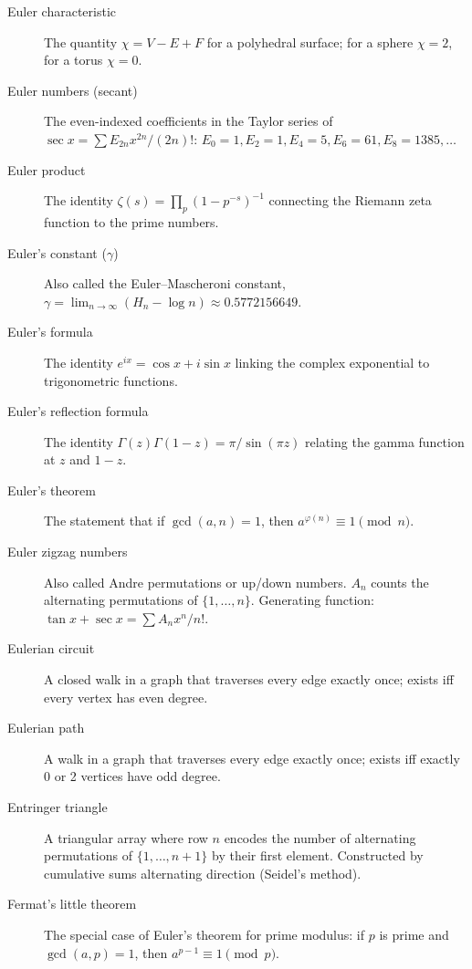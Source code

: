 \begin{description}
\item[Euler characteristic] The quantity $\chi = V - E + F$ for a polyhedral surface; for a sphere $\chi = 2$, for a torus $\chi = 0$.

\item[Euler numbers (secant)] The even-indexed coefficients in the Taylor series of $\sec x = \sum E_{2n} x^{2n}/(2n)!$: $E_0=1, E_2=1, E_4=5, E_6=61, E_8=1385, \ldots$

\item[Euler product] The identity $\zeta(s) = \prod_p (1 - p^{-s})^{-1}$ connecting the Riemann zeta function to the prime numbers.

\item[Euler's constant ($\gamma$)] Also called the Euler--Mascheroni constant, $\gamma = \lim_{n \to \infty} (H_n - \log n) \approx 0.5772156649$.

\item[Euler's formula] The identity $e^{ix} = \cos x + i \sin x$ linking the complex exponential to trigonometric functions.

\item[Euler's reflection formula] The identity $\Gamma(z)\Gamma(1-z) = \pi/\sin(\pi z)$ relating the gamma function at $z$ and $1-z$.

\item[Euler's theorem] The statement that if $\gcd(a,n) = 1$, then $a^{\varphi(n)} \equiv 1 \pmod{n}$.

\item[Euler zigzag numbers] Also called Andre permutations or up/down numbers. $A_n$ counts the alternating permutations of $\{1, \ldots, n\}$. Generating function: $\tan x + \sec x = \sum A_n x^n/n!$.

\item[Eulerian circuit] A closed walk in a graph that traverses every edge exactly once; exists iff every vertex has even degree.

\item[Eulerian path] A walk in a graph that traverses every edge exactly once; exists iff exactly 0 or 2 vertices have odd degree.

\item[Entringer triangle] A triangular array where row $n$ encodes the number of alternating permutations of $\{1, \ldots, n+1\}$ by their first element. Constructed by cumulative sums alternating direction (Seidel's method).

\item[Fermat's little theorem] The special case of Euler's theorem for prime modulus: if $p$ is prime and $\gcd(a,p) = 1$, then $a^{p-1} \equiv 1 \pmod{p}$.


\end{description}
